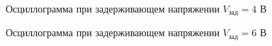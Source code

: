     \begin{figure}[H]
        \centering
        \caption{Осциллограмма при задерживающем напряжении $V_{\text{зад}} = 4$ В}
        \label{fig:vth4}
    \end{figure}

    \begin{figure}[H]
        \centering
        \caption{Осциллограмма при задерживающем напряжении $V_{\text{зад}} = 6$ В}
        \label{fig:vth6}
    \end{figure}

